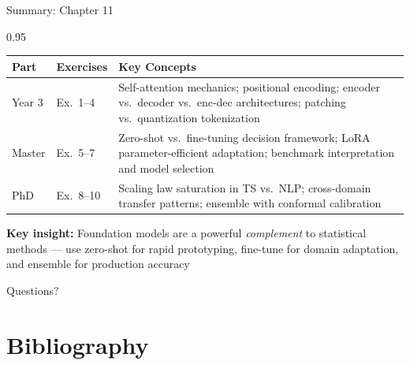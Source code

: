 \documentclass[9pt, aspectratio=169, t]{beamer}
\begin{document}
\begin{frame}{Summary: Chapter 11}
    \begin{cminipage}{0.95\textwidth}
    {\footnotesize
    \begin{center}
    \begin{tabular}{p{2.2cm}p{2.5cm}p{7.5cm}}
        \toprule
        \textbf{Part} & \textbf{Exercises} & \textbf{Key Concepts} \\
        \midrule
        Year 3 & Ex.\ 1--4 & Self-attention mechanics; positional encoding; encoder vs.\ decoder vs.\ enc-dec architectures; patching vs.\ quantization tokenization \\[4pt]
        Master & Ex.\ 5--7 & Zero-shot vs.\ fine-tuning decision framework; LoRA parameter-efficient adaptation; benchmark interpretation and model selection \\[4pt]
        PhD & Ex.\ 8--10 & Scaling law saturation in TS vs.\ NLP; cross-domain transfer patterns; ensemble with conformal calibration \\
        \bottomrule
    \end{tabular}
    \end{center}

    {\scriptsize \textbf{Key insight:} Foundation models are a powerful \textit{complement} to statistical methods --- use zero-shot for rapid prototyping, fine-tune for domain adaptation, and ensemble for production accuracy}
    }

    \vspace{0.2cm}
    \begin{center}
        \Large\textcolor{MainBlue}{Questions?}
    \end{center}
    \end{cminipage}
\end{frame}

\section{Bibliography}
\end{document}
